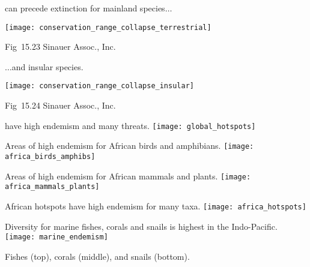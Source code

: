 \documentclass[t]{beamer}
\begin{document}
\begin{frame}{ can precede extinction for mainland species$\dots$}
	
	\centering
	
	\texttt{[image: conservation\_range\_collapse\_terrestrial]}
	
	\tinyfill Fig~15.23 \textcopyright Sinauer Assoc., Inc.
\end{frame}

\begin{frame}{$\dots$and insular species.}
	
	\centering
	
	\texttt{[image: conservation\_range\_collapse\_insular]}
	
	\tinyfill Fig~15.24 \textcopyright Sinauer Assoc., Inc.
\end{frame}

\begin{frame}[plain]{ have high endemism and many threats.}
	\centering%
		\texttt{[image: global\_hotspots]}\\
\end{frame}

\begin{frame}[plain]{Areas of high endemism for African birds and amphibians.}
	\centering%
		\texttt{[image: africa\_birds\_amphibs]}\\
\end{frame}

\begin{frame}[plain]{Areas of high endemism for African mammals and plants.}
	\centering%
		\texttt{[image: africa\_mammals\_plants]}\\
\end{frame}

\begin{frame}[plain]{African hotspots have high endemism for many taxa.}
	\centering
		\texttt{[image: africa\_hotspots]}\\
\end{frame}

\begin{frame}[plain]{Diversity for marine fishes, corals and snails is highest in the Indo-Pacific.}
	\centering
		\texttt{[image: marine\_endemism]}
		
	Fishes (top), corals (middle), and snails (bottom).
\end{frame}
\end{document}
